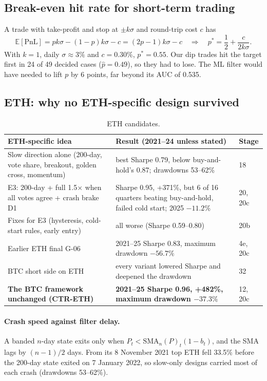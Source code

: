 \documentclass[11pt,a4paper]{article}
\theoremstyle{definition}
\begin{document}
\subsection{Break-even hit rate for short-term trading}\label{sec:breakeven}
A trade with take-profit and stop at $\pm k\sigma$ and round-trip cost $c$ has
\begin{equation}
\mathbb E[\text{PnL}]=pk\sigma-(1-p)k\sigma-c=(2p-1)k\sigma-c\quad\Longrightarrow\quad p^*=\frac12+\frac{c}{2k\sigma}.
\end{equation}
With $k=1$, daily $\sigma\approx3\%$ and $c=0.30\%$, $p^*=0.55$. Our dip trades hit the target first in 24 of 49 decided cases ($\hat p=0.49$), so they had to lose. The ML filter would have needed to lift $p$ by 6 points, far beyond its AUC of 0.535.

\subsection{ETH: why no ETH-specific design survived}
\begin{table}[htbp]\centering\small
\begin{tabularx}{\linewidth}{@{}p{60mm}L p{12mm}@{}}
\toprule
\textbf{ETH-specific idea} & \textbf{Result (2021--24 unless stated)} & \textbf{Stage}\\
\midrule
Slow direction alone (200-day, vote share, breakout, golden cross, momentum) & best Sharpe 0.79, below buy-and-hold's 0.87; drawdowns 53--62\% & 18\\
E3: 200-day + full 1.5$\times$ when all votes agree + crash brake D1 & Sharpe 0.95, +371\%, but 6 of 16 quarters beating buy-and-hold, failed cold start; 2025 $-11.2\%$ & 20, 20c\\
Fixes for E3 (hysteresis, cold-start rules, early entry) & all worse (Sharpe 0.59--0.80) & 20b\\
Earlier ETH final G-06 & 2021--25 Sharpe 0.83, maximum drawdown $-56.7\%$ & 4e, 20c\\
BTC short side on ETH & every variant lowered Sharpe and deepened the drawdown & 32\\
\textbf{The BTC framework unchanged (CTR-ETH)} & \textbf{2021--25 Sharpe 0.96, +482\%, maximum drawdown $-37.3\%$} & 12, 20c\\
\bottomrule
\end{tabularx}
\caption{ETH candidates.}
\end{table}

\paragraph{Crash speed against filter delay.} A banded $n$-day state exits only when $P_t<\mathrm{SMA}_n(P)_t(1-b_t)$, and the SMA lags by $(n-1)/2$ days. From its 8 November 2021 top ETH fell 33.5\% before the 200-day state exited on 7 January 2022, so slow-only designs carried most of each crash (drawdowns 53--62\%).
\end{document}
